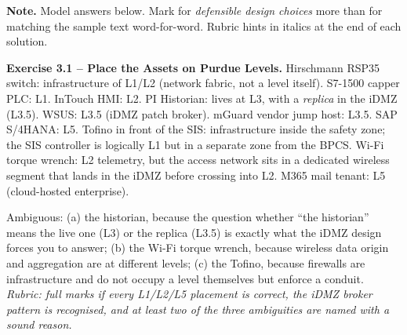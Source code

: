 \documentclass[11pt,a4paper]{article}
\begin{document}
\sheetheader

\noindent\textbf{Note.} Model answers below. Mark for \emph{defensible design choices} more than for matching the sample text word-for-word. Rubric hints in italics at the end of each solution.

\begin{solutionbox}
\textbf{Exercise 3.1 -- Place the Assets on Purdue Levels.}
Hirschmann RSP35 switch: infrastructure of L1/L2 (network fabric, not a level itself). S7-1500 capper PLC: L1. InTouch HMI: L2. PI Historian: lives at L3, with a \emph{replica} in the iDMZ (L3.5). WSUS: L3.5 (iDMZ patch broker). mGuard vendor jump host: L3.5. SAP S/4HANA: L5. Tofino in front of the SIS: infrastructure inside the safety zone; the SIS controller is logically L1 but in a separate zone from the BPCS. Wi-Fi torque wrench: L2 telemetry, but the access network sits in a dedicated wireless segment that lands in the iDMZ before crossing into L2. M365 mail tenant: L5 (cloud-hosted enterprise).

Ambiguous: (a) the historian, because the question whether ``the historian'' means the live one (L3) or the replica (L3.5) is exactly what the iDMZ design forces you to answer; (b) the Wi-Fi torque wrench, because wireless data origin and aggregation are at different levels; (c) the Tofino, because firewalls are infrastructure and do not occupy a level themselves but enforce a conduit. \emph{Rubric: full marks if every L1/L2/L5 placement is correct, the iDMZ broker pattern is recognised, and at least two of the three ambiguities are named with a sound reason.}
\end{solutionbox}
\end{document}
